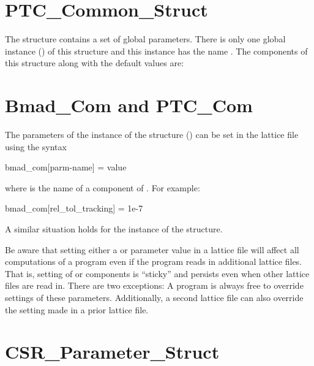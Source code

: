 {%
\section{PTC_Common_Struct}
\label{s:ptc.common}

The  structure contains a set of global parameters. There is only one global
instance () of this structure and this instance has the name
. The components of this structure along with the default values are:

\etcetc

\section{Bmad_Com and PTC_Com}
\label{s:bmad.ptc.com}

The parameters of the  instance of the  structure
() can be set in the lattice file using the syntax
\begin{example}
  bmad_com[parm-name] = value
\end{example}
where  is the name of a component of
. For example:
\begin{example}
  bmad_com[rel_tol_tracking] = 1e-7
\end{example}

A similar situation holds for the  instance of the  structure.

Be aware that setting either a  or  parameter value in a lattice file will
affect all computations of a program even if the program reads in additional lattice files. That is,
setting of  or  components is ``sticky'' and persists even when other
lattice files are read in. There are two exceptions: A program is always free to override settings
of these parameters.  Additionally, a second lattice file can also override the setting made in a
prior lattice file.

\section{CSR_Parameter_Struct}
\label{s:csr.params}

}
